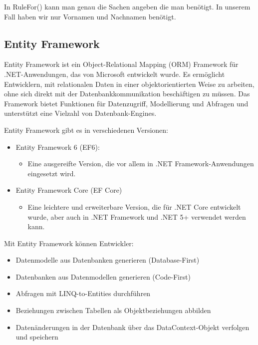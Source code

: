In RuleFor() kann man genau die Sachen angeben die man benötigt. 
In unserem Fall haben wir nur Vornamen und Nachnamen benötigt.
\newpage

\subsection{Entity Framework}

Entity Framework ist ein Object-Relational Mapping (ORM) Framework für .NET-Anwendungen, das von Microsoft entwickelt wurde. Es ermöglicht Entwicklern, mit relationalen Daten in einer objektorientierten Weise zu arbeiten, ohne sich direkt mit der Datenbankkommunikation beschäftigen zu müssen. Das Framework bietet Funktionen für Datenzugriff, Modellierung und Abfragen und unterstützt eine Vielzahl von Datenbank-Engines.

Entity Framework gibt es in verschiedenen Versionen:

\begin{itemize}
    \item Entity Framework 6 (EF6): 
    \begin{itemize}
        \item Eine ausgereifte Version, die vor allem in .NET Framework-Anwendungen eingesetzt wird.

    \end{itemize}
\end{itemize}

\begin{itemize}
    \item Entity Framework Core (EF Core)
    \begin{itemize}
        \item Eine leichtere und erweiterbare Version, die für .NET Core entwickelt wurde, aber auch in .NET Framework und .NET 5+ verwendet werden kann.

    \end{itemize}
\end{itemize}

Mit Entity Framework können Entwickler:

\begin{itemize}
    \item Datenmodelle aus Datenbanken generieren (Database-First)
    \item Datenbanken aus Datenmodellen generieren (Code-First)
    \item Abfragen mit LINQ-to-Entities durchführen
    \item Beziehungen zwischen Tabellen als Objektbeziehungen abbilden
    \item Datenänderungen in der Datenbank über das DataContext-Objekt verfolgen und speichern

\end{itemize}

